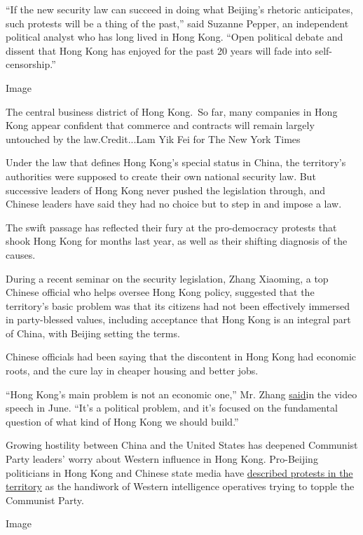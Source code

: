``If the new security law can succeed in doing what Beijing's rhetoric
anticipates, such protests will be a thing of the past,'' said Suzanne
Pepper, an independent political analyst who has long lived in Hong
Kong. ``Open political debate and dissent that Hong Kong has enjoyed for
the past 20 years will fade into self-censorship.''

Image

The central business district of Hong Kong.~So far, many companies in
Hong Kong appear confident that commerce and contracts will remain
largely untouched by the law.Credit...Lam Yik Fei for The New York Times

Under the law that defines Hong Kong's special status in China, the
territory's authorities were supposed to create their own national
security law. But successive leaders of Hong Kong never pushed the
legislation through, and Chinese leaders have said they had no choice
but to step in and impose a law.

The swift passage has reflected their fury at the pro-democracy protests
that shook Hong Kong for months last year, as well as their shifting
diagnosis of the causes.

During a recent seminar on the security legislation, Zhang Xiaoming, a
top Chinese official who helps oversee Hong Kong policy, suggested that
the territory's basic problem was that its citizens had not been
effectively immersed in party-blessed values, including acceptance that
Hong Kong is an integral part of China, with Beijing setting the terms.

Chinese officials had been saying that the discontent in Hong Kong had
economic roots, and the cure lay in cheaper housing and better jobs.

``Hong Kong's main problem is not an economic one,'' Mr. Zhang
\href{https://www.hmo.gov.cn/gab/bld/zxm/gzdt/202006/t20200608_21923.html}{said}in
the video speech in June. ``It's a political problem, and it's focused
on the fundamental question of what kind of Hong Kong we should build.''

Growing hostility between China and the United States has deepened
Communist Party leaders' worry about Western influence in Hong Kong.
Pro-Beijing politicians in Hong Kong and Chinese state media have
\href{https://www.nytimes.com/2014/10/31/world/asia/dan-garrett-hong-kong-protests.html}{described
protests in the territory} as the handiwork of Western intelligence
operatives trying to topple the Communist Party.

Image

